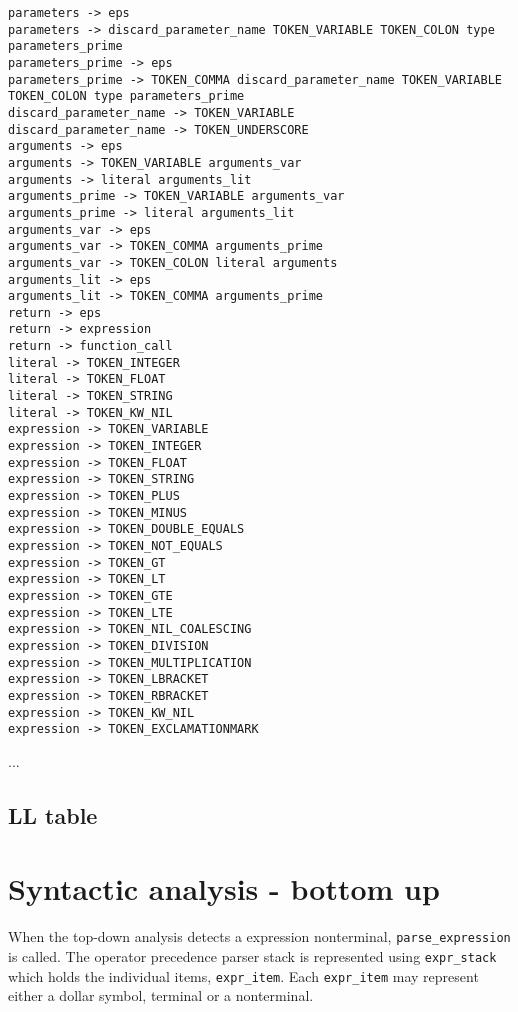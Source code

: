\documentclass[11pt]{article}
\begin{document}
\begin{lstlisting}[style=PseudoStyle, caption=LL (1) grammar example]
parameters -> eps
parameters -> discard_parameter_name TOKEN_VARIABLE TOKEN_COLON type parameters_prime
parameters_prime -> eps
parameters_prime -> TOKEN_COMMA discard_parameter_name TOKEN_VARIABLE TOKEN_COLON type parameters_prime
discard_parameter_name -> TOKEN_VARIABLE
discard_parameter_name -> TOKEN_UNDERSCORE
arguments -> eps
arguments -> TOKEN_VARIABLE arguments_var
arguments -> literal arguments_lit
arguments_prime -> TOKEN_VARIABLE arguments_var
arguments_prime -> literal arguments_lit
arguments_var -> eps
arguments_var -> TOKEN_COMMA arguments_prime
arguments_var -> TOKEN_COLON literal arguments
arguments_lit -> eps
arguments_lit -> TOKEN_COMMA arguments_prime
return -> eps
return -> expression
return -> function_call
literal -> TOKEN_INTEGER
literal -> TOKEN_FLOAT
literal -> TOKEN_STRING
literal -> TOKEN_KW_NIL
expression -> TOKEN_VARIABLE
expression -> TOKEN_INTEGER
expression -> TOKEN_FLOAT
expression -> TOKEN_STRING
expression -> TOKEN_PLUS
expression -> TOKEN_MINUS
expression -> TOKEN_DOUBLE_EQUALS
expression -> TOKEN_NOT_EQUALS
expression -> TOKEN_GT
expression -> TOKEN_LT
expression -> TOKEN_GTE
expression -> TOKEN_LTE
expression -> TOKEN_NIL_COALESCING
expression -> TOKEN_DIVISION
expression -> TOKEN_MULTIPLICATION
expression -> TOKEN_LBRACKET
expression -> TOKEN_RBRACKET
expression -> TOKEN_KW_NIL
expression -> TOKEN_EXCLAMATIONMARK
\end{lstlisting}

\begin{landscape}
...

\subsection{LL table}


\end{landscape}
\restoregeometry

\section{Syntactic analysis - bottom up}

When the top-down analysis detects a expression nonterminal, \texttt{parse\_expression} is called. The operator precedence parser stack is represented using \texttt{expr\_stack} which holds the individual items, \texttt{expr\_item}. Each \texttt{expr\_item} may represent either a dollar symbol, terminal or a nonterminal.
\end{document}
